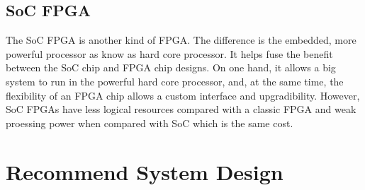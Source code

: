 \documentclass[12pt,article]{memoir}
\begin{document}
\section{SoC FPGA}
The SoC FPGA is another kind of FPGA. The difference is the embedded, more powerful processor as know as hard core processor. It helps fuse the benefit between the SoC chip and FPGA chip designs. On one hand, it allows a big system to run in the powerful hard core processor, and, at the same time, the flexibility of an FPGA chip allows a custom interface and upgradibility. However, SoC FPGAs have less logical resources compared with a classic FPGA and weak proessing power when compared with SoC which is the same cost.
\newpage
\chapter{Recommend System Design}
\end{document}
